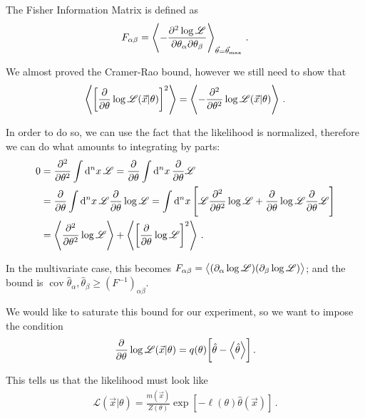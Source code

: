 \documentclass[main.tex]{subfiles}
\begin{document}

The Fisher Information Matrix is defined as 
%
\begin{align}
F_{\alpha \beta } = \expval{- \pdv[2]{\log \mathscr{L}}{\theta _\alpha }{\theta _\beta }}_{\vec{\theta} = \vec{\theta} _{\text{max}}}
\,.
\end{align}

We almost proved the Cramer-Rao bound, however we still need to show that 
%
\begin{align}
\expval{\qty[\pdv{}{\theta } \log \mathscr{L}(\vec{x} | \theta )]^2}
= \expval{- \pdv[2]{}{\theta } \log \mathscr{L}(\vec{x} | \theta )}
\,.
\end{align}

In order to do so, we can use the fact that the likelihood is normalized, therefore we can do what amounts to integrating by parts:
%
\begin{align}
0 &= \pdv[2]{}{\theta } \int \dd[n]{x} \mathscr{L} = \pdv{}{\theta } \int \dd[n]{x} \pdv{}{\theta } \mathscr{L}  \\
&= \pdv{}{\theta } \int \dd[n]{x} \mathscr{L} \pdv{}{\theta } \log \mathscr{L} = \int \dd[n]{x} \qty[\mathscr{L}\pdv[2]{}{\theta } \log \mathscr{L} + \pdv{}{\theta } \log \mathscr{L} \pdv{}{\theta } \mathscr{L}]  \\
&= \expval{\pdv[2]{}{\theta } \log \mathscr{L}} + \expval{\qty[\pdv{}{\theta } \log \mathscr{L}]^2}
\,.
\end{align}

In the multivariate case, this becomes \(F_{\alpha \beta } = \expval{(\partial_{\alpha } \log \mathscr{L}) (\partial_{\beta } \log \mathscr{L})}\); and the bound is \(\operatorname{cov}{\hat{\theta}_\alpha , \hat{\theta}_\beta } \geq (F^{-1})_{\alpha \beta }\). 

We would like to saturate this bound for our experiment, so we want to impose the condition 
%
\begin{align}
\pdv[]{}{\theta } \log \mathscr{L} (\vec{x} | \theta ) = q(\theta ) \qty[\hat{\theta} - \expval{\hat{\theta}}]
\,.
\end{align}

This tells us that the likelihood must look like 
%
\begin{align}
\mathscr{L}(\vec{x} | \theta ) = \frac{m(\vec{x})}{Z(\theta )} \exp[- \ell(\theta ) \hat{\theta}(\vec{x})]
\,.
\end{align}
\end{document}
